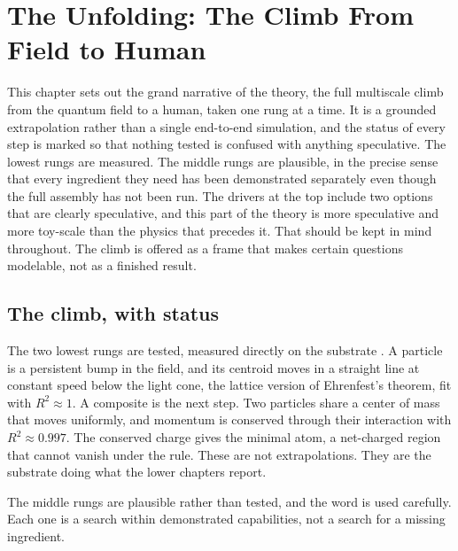 \section{The Unfolding: The Climb From Field to Human}

This chapter sets out the grand narrative of the theory, the full multiscale climb from the quantum field to a
human, taken one rung at a time. It is a grounded extrapolation rather than a single end-to-end simulation, and
the status of every step is marked so that nothing tested is confused with anything speculative. The lowest rungs
are measured. The middle rungs are plausible, in the precise sense that every ingredient they need has been
demonstrated separately even though the full assembly has not been run. The drivers at the top include two options
that are clearly speculative, and this part of the theory is more speculative and more toy-scale than the physics
that precedes it. That should be kept in mind throughout. The climb is offered as a frame that makes certain
questions modelable, not as a finished result.

\subsection{The climb, with status}

The two lowest rungs are tested, measured directly on the substrate \cite{pollard2026vibetest}. A particle is a
persistent bump in the field, and its centroid moves in a straight line at constant speed below the light cone,
the lattice version of Ehrenfest's theorem, fit with $R^2 \approx 1$. A composite is the next step. Two particles
share a center of mass that moves uniformly, and momentum is conserved through their interaction with $R^2 \approx
0.997$. The conserved charge gives the minimal atom, a net-charged region that cannot vanish under the rule. These
are not extrapolations. They are the substrate doing what the lower chapters report.

The middle rungs are plausible rather than tested, and the word is used carefully. Each one is a search within
demonstrated capabilities, not a search for a missing ingredient.

